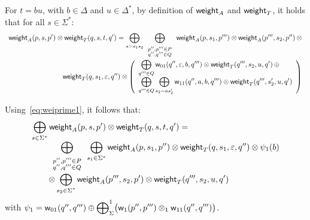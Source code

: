\noindent
For $t = b u$, with $b \in \Delta$ and $u \in \Delta^*$,
by definition of $\mathsf{weight}_A$ and $\mathsf{weight}_T$,
it holds that for all $s \in \Sigma^*$:
\[
\begin{array}{l}
\displaystyle\weight_A(p, s, p') \otimes \weight_T(q, s, t, q') = 
\bigoplus_{s = s_1 s_2}
\displaystyle\bigoplus_{\begin{array}{c}
                        \scriptstyle p'', p''' \in P\\[-1ex]
                        \scriptstyle q'', q''' \in Q
                        \end{array}}
\weight_A(p, s_1, p''') \otimes \weight_A(p''', s_2, p'') \mathop\otimes \\
\hfill\displaystyle
\weight_T(q, s_1, \varepsilon, q'') \otimes
 \left(
 \begin{array}{l}
 \displaystyle
 \bigoplus_{q''' \in Q}
 \wei_{01}(q'', \varepsilon, b, q''') \otimes \weight_T(q''', s_2, u, q')
 \mathop\oplus\\
 \displaystyle
 \bigoplus_{q''' \in Q} \bigoplus_{s_2 = a s'_2}
 \wei_{11}(q'', a, b, q''') \otimes \weight_T(q''', s'_2, u, q')
 \end{array}
 \right)
\end{array}
\]

\noindent
Using~\eqref{eq:weiprime1}, it follows that:
\[
\begin{array}{l}
\displaystyle\bigoplus_{s \in \Sigma^*} 
\displaystyle\mathsf{weight}_A(p, s, p') \otimes \mathsf{weight}_T(q, s, t, q') = \\
\qquad
\displaystyle\bigoplus_{\begin{array}{c}
                        \scriptstyle p'', p''' \in P\\[-1ex]
                        \scriptstyle q'', q''' \in Q
                        \end{array}}
\bigoplus_{s_1 \in \Sigma^*}
\mathsf{weight}_A(p, s_1, p'') \otimes \mathsf{weight}_T(q, s_1, \varepsilon, q'') \otimes \psi_1(b)\\
\qquad
\otimes\displaystyle\bigoplus_{\scriptstyle s_2 \in \Sigma^*}
\mathsf{weight}_A(p''', s_2, p') \otimes \mathsf{weight}_T(q''', s_2, u, q')
\end{array}
\]
with 
$\psi_1 = \mathsf{w}_{01}(q'', q''') \oplus
\displaystyle{\bigoplus}_\Sigma^1 \bigl(\mathsf{w}_1(p'', p''') 
 \otimes_1 \mathsf{w}_{11}(q'', q''')\bigr)$.


